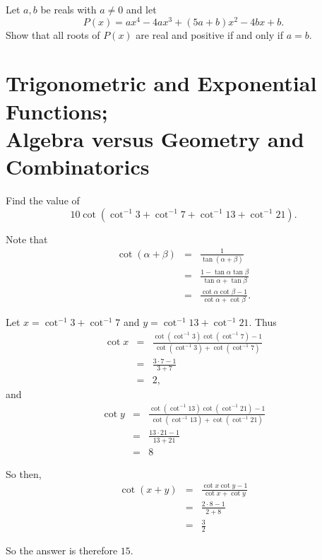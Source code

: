 \documentclass[11pt]{article}
\theoremstyle{definition}
\begin{document}
%	


\begin{question}[name={2023 Pan African Math Olympiad, \href{https://artofproblemsolving.com/community/c6h3077077p27789931}{Problem 5}}]
	Let $a, b$ be reals with $a \neq 0$ and let$$P(x)=ax^4-4ax^3+(5a+b)x^2-4bx+b.$$Show that all roots of $P(x)$ are real and positive if and only if $a=b$.
\end{question}


\newpage
\section{Trigonometric and Exponential Functions;\\ Algebra versus  Geometry and Combinatorics}

%
%
\begin{question}[name={1984 AIME, \href{https://artofproblemsolving.com/community/c4h66515p392631}{Problem 13}}]
	Find the value of $$10\cot(\cot^{-1}3+\cot^{-1}7+\cot^{-1}13+\cot^{-1}21).$$
\end{question}


\begin{solution}[name={Solution by joml88}]
	Note that
	\begin{eqnarray*} \cot(\alpha+\beta) &=& \frac 1{\tan(\alpha+\beta)}\\ &=& \frac{1-\tan\alpha\tan\beta}{\tan\alpha+\tan\beta}\\ &=& \frac{\cot\alpha\cot\beta-1}{\cot\alpha+\cot\beta}. \end{eqnarray*}
	
	Let $x=\cot^{-1}3+\cot^{-1}7$ and $y=\cot^{-1}13+\cot^{-1}21.$ Thus
	\begin{eqnarray*} \cot x &=& \frac{\cot(\cot^{-1}3)\cot(\cot^{-1}7)-1}{\cot(\cot^{-1}3)+\cot(\cot^{-1}7)}\\ &=& \frac{3\cdot 7-1}{3+7}\\ &=& 2, \end{eqnarray*}
	and
	\begin{eqnarray*} \cot y &=& \frac{\cot(\cot^{-1}13)\cot(\cot^{-1}21)-1}{\cot(\cot^{-1}13)+\cot(\cot^{-1}21)}\\ &=& \frac{13\cdot 21-1}{13+21}\\ &=& 8 \end{eqnarray*}
	
	So then,
	\begin{eqnarray*} \cot(x+y) &=& \frac{\cot x\cot y-1}{\cot x+\cot y}\\ &=& \frac{2\cdot 8-1}{2+8}\\ &=& \frac 32 \end{eqnarray*}
	
	So the answer is therefore $\boxed{15}$.
\end{solution}
%
%
%
\end{document}
